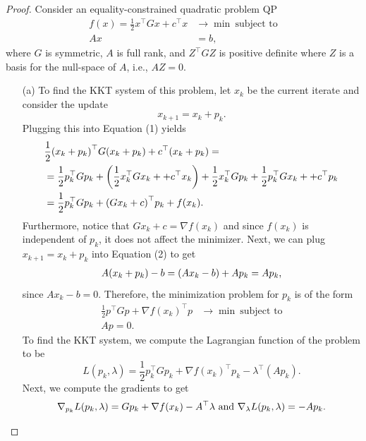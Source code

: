 \documentclass[12pt]{report}
\begin{document}
\begin{problem}
\begin{proof}
Consider an equality-constrained quadratic problem QP 
\begin{align}
    f(x) = \frac{1}{2}x^\top G x + c^\top x &\rightarrow \min ~\text{subject to}\\
    Ax &= b,
\end{align}
where $G$ is symmetric, $A$ is full rank, and $Z^\top GZ$ is positive definite where $Z$ is a basis for the null-space of $A$, i.e., $AZ = 0$.
\begin{enumerate}
    \item [(a)]
    To find the KKT system of this problem, let $x_k$ be the current iterate and consider the update 
    \begin{equation*}
        x_{k+1} = x_k + p_k.
    \end{equation*}
    Plugging this into Equation (1) yields
    \begin{align*}
        &\frac{1}{2}{\left(x_k + p_k\right)}^\top G {\left(x_k + p_k\right)} + c^\top {\left(x_k + p_k\right)} =\\ 
        &= \frac{1}{2}p_k^\top G p_k + {\left(\frac{1}{2} x_k^\top G x_k + + c^\top x_k \right)}+ \frac{1}{2} x_k^\top G p_k + \frac{1}{2}p_k^\top G x_k +  + c^\top p_k \\
        &= \frac{1}{2}p_k^\top G p_k + {\left(Gx_k + c\right)}^\top p_k + f(x_k).
    \end{align*}
    Furthermore, notice that $G x_k + c = \nabla f(x_k)$ and since $f(x_k)$ is independent of $p_k$, it does not affect the minimizer. Next, we can plug $x_{k+1} = x_k + p_k$ into Equation (2) to get
    \begin{align*}
        A(x_k + p_k) - b = {\left(Ax_k - b\right)} + A p_k = A p_k, 
    \end{align*}
    since $Ax_k - b = 0$. Therefore, the minimization problem for $p_k$ is of the form
    \begin{align*}
        \frac{1}{2}p^\top G p + \nabla f(x_k)^\top p &\rightarrow \min ~\text{subject to}\\
        Ap = 0.
    \end{align*}
    To find the KKT system, we compute the Lagrangian function of the problem to be
    \begin{equation*}
        L(p_k,\lambda) = \frac{1}{2}p_k^\top G p_k + \nabla f(x_k)^\top p_k - \lambda^\top(Ap_k).
    \end{equation*}
    Next, we compute the gradients to get
    \begin{equation*}
        \nabla_{p_k} L(p_k,\lambda) = G p_k + \nabla f(x_k) - A^\top \lambda \and \nabla_\lambda L(p_k,\lambda) = - Ap_k.

\end{equation*}
\end{enumerate}
\end{proof}
\end{problem}
\end{document}
